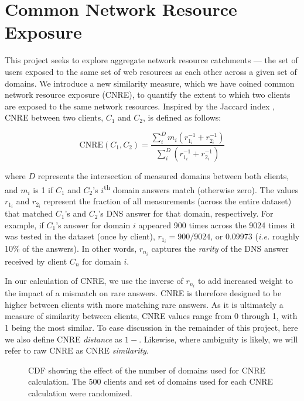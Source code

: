 \section{Common Network Resource Exposure} \label{sect:cnre}

This project seeks to explore aggregate network resource catchments --- the set of
users exposed to the same set of web resources as each other across a given set
of domains. We introduce a new similarity measure, which we have coined common
network resource exposure (CNRE), to quantify the extent to which two clients
are exposed to the same network resources. Inspired by the Jaccard index \cite{jaccard1908nouvelles},
CNRE between two clients, $C_1$ and $C_2$, is defined as follows:

\[ \textrm{CNRE}(C_1, C_2) = \frac{ \sum_{i}^D  m_{i} (r_{1_i}^{-1}+r_{2_i}^{-1})}{ \sum_{i}^D (r_{1_i}^{-1}+r_{2_i}^{-1})} \]

where $D$ represents the intersection of measured domains between both clients, 
and $m_{i}$ is 1 if $C_{1}$ and $C_{2}$'s
$i$\textsuperscript{th} domain answers match (otherwise zero). The values
$r_{1_i}$ and $r_{2_i}$ represent the fraction of all measurements (across the
entire dataset) that matched $C_1$'s and $C_2$'s DNS answer for that domain,
respectively. For example, if $C_1$'s answer for domain $i$ appeared 900 times
across the 9024 times it was tested in the dataset (once by client), 
\(r_{1_i} =  900 / 9024\), or 0.09973 (\emph{i.e.} roughly 10\% of the answers). 
In other words, $r_{n_i}$ captures the
\emph{rarity} of the DNS answer received by client $C_n$ for domain $i$.

In our calculation of CNRE, we use the inverse of $r_{n_i}$ to add increased
weight to the impact of a mismatch on rare answers. CNRE is therefore designed
to be higher between clients with more matching rare answers. As it is
ultimately a measure of similarity between clients, CNRE values range from 0
through 1, with 1 being the most similar. To ease discussion in the remainder of
this project, here we also define CNRE \emph{distance} as \(1 - \). Likewise, where
ambiguity is likely, we will refer to raw CNRE as CNRE \emph{similarity}. 

\begin{figure}
    \caption{CDF showing the effect of the number of domains used for CNRE
    calculation. The 500 clients and set of domains used for each CNRE
    calculation were randomized.}
    \label{fig:90cnre}
\end{figure}

